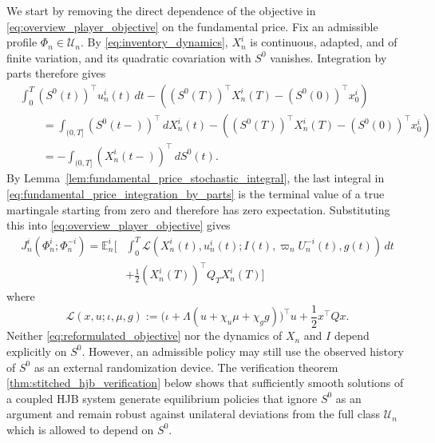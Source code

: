 \documentclass[12pt]{article}
\numberwithin{equation}{section}
\theoremstyle{definition}
\begin{document}
We start by removing the direct dependence of the objective in
\eqref{eq:overview_player_objective} on the fundamental price.
Fix an admissible profile \(\Phi_n\in\mathcal U_n\). By
\eqref{eq:inventory_dynamics}, \(X_n^i\) is continuous, adapted, and of finite
variation, and its quadratic covariation with \(S^0\) vanishes. Integration by parts therefore gives
\begin{equation}\label{eq:fundamental_price_integration_by_parts}
\begin{aligned}
&\int_0^T (S^0(t))^\top u_n^i(t)\,dt
-\left((S^0(T))^\top X_n^i(T)-(S^0(0))^\top x_0^i\right)
\\
&\qquad
=\int_{(0,T]}(S^0(t-))^\top\,dX_n^i(t)
-\left((S^0(T))^\top X_n^i(T)-(S^0(0))^\top x_0^i\right)
\\
&\qquad
=-\int_{(0,T]}(X_n^i(t-))^\top\,dS^0(t).
\end{aligned}
\end{equation}
By Lemma~\ref{lem:fundamental_price_stochastic_integral}, the last integral in
\eqref{eq:fundamental_price_integration_by_parts} is the terminal value of a
true martingale starting from zero and therefore has zero expectation.
Substituting this into \eqref{eq:overview_player_objective} gives
\begin{equation}\label{eq:reformulated_objective}
\begin{aligned}
J_n^i(\Phi_n^i;\Phi_n^{-i})
={}
\mathbb E_n^i\Bigg[&
\int_0^T
\mathcal L\left(
X_n^i(t),u_n^i(t);
I(t),\varpi_nU_n^{-i}(t),g(t)
\right)\,dt
\\
&+\frac{1}{2}(X_n^i(T))^\top Q_TX_n^i(T)
\Bigg]
\end{aligned}
\end{equation}
where
\begin{equation}\label{eq:reduced_running_cost}
\mathcal L(x,u;\iota,\mu,g)
:=
\bigl(\iota+\Lambda(u+\chi_u\mu+\chi_g g)\bigr)^\top u
+\frac{1}{2}x^\top Q x.
\end{equation}
Neither \eqref{eq:reformulated_objective} nor the dynamics of \(X_n\) and
\(I\) depend explicitly on \(S^0\). However, an admissible policy may still
use the observed history of \(S^0\) as an external randomization device. The
verification theorem \ref{thm:stitched_hjb_verification} below shows that sufficiently
smooth solutions of a coupled HJB system generate equilibrium policies that
ignore \(S^0\) as an argument
and remain robust against unilateral deviations from the full class
\(\mathcal U_n\) which is allowed to depend on \(S^0\).
\end{document}
